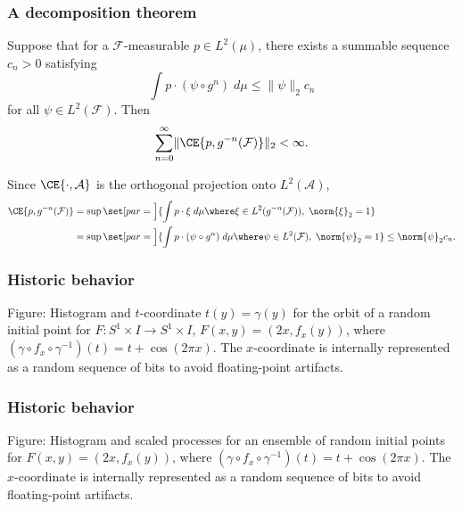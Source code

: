 \documentclass[shortlabels, 9pt, aspectratio=2013]{beamer}
\begin{document}
\begin{frame}
  \frametitle{A decomposition theorem}
  \begin{lemma}
    Suppose that for a \(\mathcal{F}\)-measurable \(p \in L^{2}(\mu)\), there exists a summable sequence \(c_n > 0\) satisfying
    \begin{equation*}
      \int p \cdot (\psi \circ g^n) \;d\mu \leq \lVert \psi \rVert_2c_n
    \end{equation*}
    for all \(\psi \in L^2(\mathcal{F})\). Then
    \begin{equation*}
      \sum_{n = 0}^{\infty} \lVert \CE{p, g^{-n}(\mathcal{F})} \rVert_2 < \infty.
    \end{equation*}
  \end{lemma}
  \begin{proofs}
    Since \(\CE{\cdot, \mathcal{A}}\) is the orthogonal projection onto \(L^2(\mathcal{A})\),
    \begin{align*}
      \CE{p, g^{-n}(\mathcal{F})}
      &= \sup \set[par = \Big]{\int p \cdot \xi \;d\mu \where \xi \in L^2(g^{-n}(\mathcal{F})),\;\norm{\xi}_2 = 1}\\
      &= \sup \set[par = \Big]{\int p \cdot (\psi \circ g^n) \;d\mu \where \psi \in L^2(\mathcal{F}),\;\norm{\psi}_2 = 1}
      \le \norm{\psi}_2 c_n.
    \end{align*}\vspace*{-1em}
  \end{proofs}
\end{frame}

\begin{frame}
  \frametitle{Historic behavior}
  \begin{center}
  \end{center}
  \small
  Figure: Histogram and \(t\)-coordinate \(t(y) = \gamma(y)\) for the orbit of a random initial point for \(F \colon S^1 \times I \to S^1 \times I\), \(F(x,y) = (2x, f_x(y))\), where \((\gamma \circ f_x \circ \gamma ^{-1})(t) = t + \cos (2 \pi x)\). The \(x\)-coordinate is internally represented as a random sequence of bits to avoid floating-point artifacts.
\end{frame}
\begin{frame}
  \frametitle{Historic behavior}
  \begin{center}
  \end{center}
  \small
  Figure: Histogram and scaled processes for an ensemble of random initial points for \(F(x,y) = (2x, f_x(y))\), where \((\gamma \circ f_x \circ \gamma ^{-1})(t) = t + \cos (2 \pi x)\). The \(x\)-coordinate is internally represented as a random sequence of bits to avoid floating-point artifacts.
\end{frame}
\end{document}
